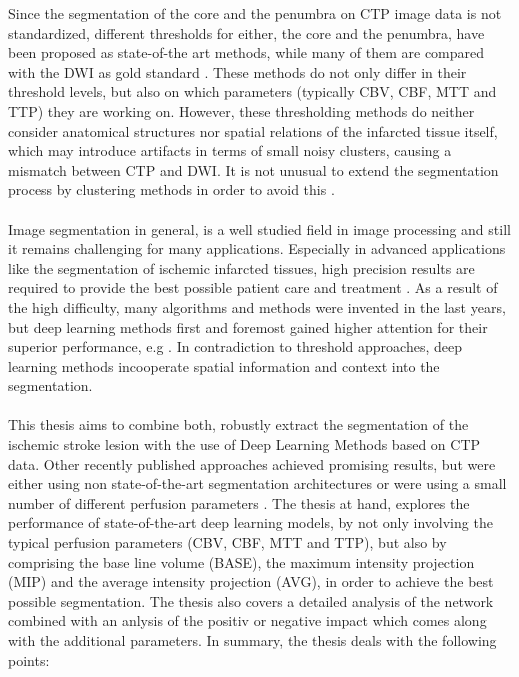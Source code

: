 \documentclass{article}%
\begin{document}
Since the segmentation of the core and the penumbra on CTP image data is not standardized, different thresholds for either, the core and the penumbra, have been proposed as state-of-the art methods, while many of them are compared with the DWI as gold standard \cite{wintermark2007comparison, wintermark2006perfusion, schaefer2008quantitative, soares2010reperfusion, campbell2011cerebral}. These methods do not only differ in their threshold levels, but also on which parameters (typically CBV, CBF, MTT and TTP) they are working on. However, these thresholding methods do neither consider anatomical structures nor spatial relations of the infarcted tissue itself, which may introduce artifacts in terms of small noisy clusters, causing a mismatch between CTP and DWI. It is not unusual to extend the segmentation process by clustering methods in order to avoid this \cite{bivard2011defining, bivard2013perfusion}. \\\\
Image segmentation in general, is a well studied field in image processing and still it remains challenging for many applications. Especially in advanced applications like the segmentation of ischemic infarcted tissues, high precision results are required to provide the best possible patient care and treatment \cite{rastgarpour2013problems, szeliski2010computer}. As a result of the high difficulty, many algorithms and methods were invented in the last years, but deep learning methods first and foremost gained higher attention for their superior performance, e.g \cite{badrinarayanan2017segnet, ciresan2012deep, long2015fully, ronneberger2015u}. In contradiction to threshold approaches, deep learning methods incooperate spatial information and context into the segmentation.\\\\
This thesis aims to combine both, robustly extract the segmentation of the ischemic stroke lesion with the use of Deep Learning Methods based on CTP data. Other recently published approaches achieved promising results, but were either using non state-of-the-art segmentation architectures \cite{robben2018prediction} or were using a small number of different perfusion parameters \cite{lucas2018learning, abulnaga2018ischemic}. The thesis at hand, explores the performance of state-of-the-art deep learning models, by not only involving the typical perfusion parameters (CBV, CBF, MTT and TTP), but also by comprising the base line volume (BASE), the maximum intensity projection (MIP) and the average intensity projection (AVG), in order to achieve the best possible segmentation. The thesis also covers a detailed analysis of the network combined with an anlysis of the positiv or negative impact which comes along with the additional parameters. In summary, the thesis deals with the following points:
\end{document}

